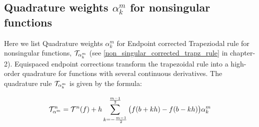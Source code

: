 \documentclass[../document.tex]{subfiles}
\begin{document}
	
	\subsection{Quadrature weights $\alpha_{k}^m$ for nonsingular functions}
	
	Here we list Quadrature weights $\alpha_{k}^m$ for Endpoint corrected Trapeziodal rule for nonsingular functions, $\mathcal{T}_{\alpha^m_k}$ 
	(see \ref{non_singular_corrected_trapz_rule} in chapter-2). Equispaced endpoint corrections transform the trapezoidal rule into a high-order quadrature for functions with several continuous derivatives. The quadrature rule $\mathcal{T}_{\alpha^m_k}$ is given by the formula:
	
	\begin{equation}   
		\mathcal{T}_{\alpha^m}^{n} = \mathcal{T}^{n}(f)  + 
		h \sum_{k = -\frac{m-1}{2}}^{\frac{m-1}{2}} 
		\big(
		f(b+kh) - f(b-kh)
		\big)		\alpha^m_k 
	\end{equation}
	
\end{document}
